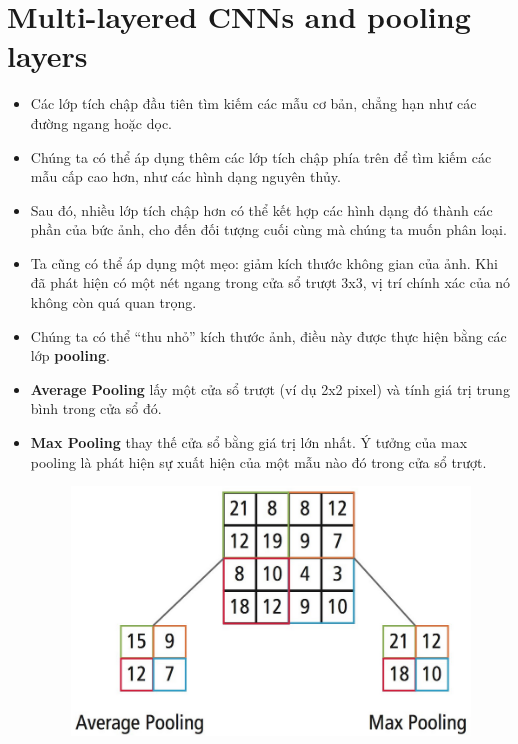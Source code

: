 \documentclass{book}
\begin{document}
\section{Multi-layered CNNs and pooling layers}
\begin{itemize}
    \item Các lớp tích chập đầu tiên tìm kiếm các mẫu cơ bản, chẳng hạn như các đường ngang hoặc dọc.
    \item Chúng ta có thể áp dụng thêm các lớp tích chập phía trên để tìm kiếm các mẫu cấp cao hơn, như các hình dạng nguyên thủy.
    \item Sau đó, nhiều lớp tích chập hơn có thể kết hợp các hình dạng đó thành các phần của bức ảnh, cho đến đối tượng cuối cùng mà chúng ta muốn phân loại.
    \item Ta cũng có thể áp dụng một mẹo: giảm kích thước không gian của ảnh. Khi đã phát hiện có một nét ngang trong cửa sổ trượt 3x3, vị trí chính xác của nó không còn quá quan trọng.
    \item Chúng ta có thể “thu nhỏ” kích thước ảnh, điều này được thực hiện bằng các lớp \textbf{pooling}.
    \item \textbf{Average Pooling} lấy một cửa sổ trượt (ví dụ 2x2 pixel) và tính giá trị trung bình trong cửa sổ đó.
    \item \textbf{Max Pooling} thay thế cửa sổ bằng giá trị lớn nhất. Ý tưởng của max pooling là phát hiện sự xuất hiện của một mẫu nào đó trong cửa sổ trượt.
    \begin{figure}[H]
        \centering
        \includegraphics[width=1.0\linewidth]{images/pooling.png}
        \label{fig:pooling}
    \end{figure}


\end{itemize}
\end{document}
